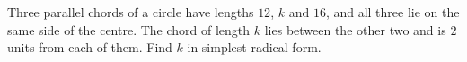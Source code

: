 Three parallel chords of a circle have lengths $12$, $k$ and $16$, and all three lie on the same side of the centre. The chord of length $k$ lies between the other two and is $2$ units from each of them. Find $k$ in simplest radical form.
